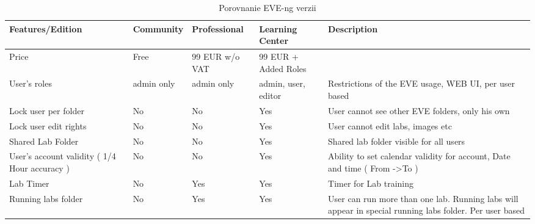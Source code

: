 \begin{longtable}{| m{3cm} | m{2cm} | m{2cm} | m{2cm} | m{4cm} |}
\caption{Porovnanie EVE-ng verzii}
\label{tab:eve_ng_versions} \\
\hline
Features/Edition                                      & Community         & Professional    & Learning Center      & Description                                                                                                   \\ \hline
Price                                                 & Free              & 99 EUR w/o VAT  & 99 EUR + Added Roles &                                                                                                               \\ \hline
User's roles                                          & admin only        & admin only      & admin, user, editor  & Restrictions of the EVE usage, WEB UI, per user based                                                         \\ \hline
Lock user per folder                                  & No                & No              & Yes                  & User cannot see other EVE folders, only his own                                                               \\ \hline
Lock user edit rights                                 & No                & No              & Yes                  & User cannot edit labs, images etc                                                                             \\ \hline
Shared Lab Folder                                     & No                & No              & Yes                  & Shared lab folder visible for all users                                                                       \\ \hline
User's account validity ( 1/4 Hour accuracy )         & No                & No              & Yes                  & Ability to set calendar validity for account, Date and time ( From -\textgreater To )                         \\ \hline
Lab Timer                                             & No                & Yes             & Yes                  & Timer for Lab training                                                                                        \\ \hline
Running labs folder                                   & No                & Yes             & Yes                  & User can run more than one lab. Running labs will appear in special running labs folder. Per user based       \\ \hline

\end{longtable}
